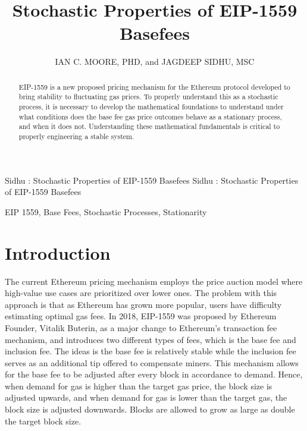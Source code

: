\documentclass[peerreview]{ieeesyscoin}
\begin{document}
\linenumbers
\history{}

\title{\centering Stochastic Properties of EIP-1559 Basefees}
\author{\centering  \uppercase{Ian C. Moore, PhD}, 
and \uppercase{Jagdeep Sidhu, MSc}}

\address[1]{\centering  (e-mail: ic3moore@gmail.com)}
\tfootnote{}
\address[2]{\centering Syscoin Core Developer, Blockchain Foundry Inc.(e-mail: jsidhu@blockchainfoundry.co)}


\markboth
{Sidhu \headeretal: Stochastic Properties of EIP-1559 Basefees}
{Sidhu \headeretal: Stochastic Properties of EIP-1559 Basefees}

\corresp{}

\begin{abstract}
EIP-1559 is a new proposed pricing mechanism for the Ethereum protocol developed to bring stability to fluctuating gas prices. To properly understand this as a stochastic process, it is necessary to develop the mathematical foundations to understand under what conditions does the base fee gas price outcomes behave as a stationary process, and when it does not. Understanding these mathematical fundamentals is critical to properly engineering a stable system.
\end{abstract}

\begin{keywords}
EIP 1559, Base Fees, Stochastic Processes, Stationarity
\end{keywords}

\titlepgskip=-15pt

\maketitle

\section{Introduction}
\label{sec:introduction}

The current Ethereum pricing mechanism employs the price auction model where high-value use cases are prioritized over lower ones. The problem with this approach is that as Ethereum has grown more popular, users have difficulty estimating optimal gas fees. In 2018, EIP-1559 was  proposed by Ethereum Founder, Vitalik Buterin, as a major change to Ethereum's transaction fee mechanism, and introduces two different types of fees, which is the base fee and inclusion fee. The ideas is the base fee is relatively stable while the inclusion fee serves as an additional tip offered to compensate miners. This mechanism allows for the base fee to be adjusted after every block in accordance to demand. Hence, when demand for gas is higher than the target gas price, the block size is adjusted upwards, and when demand for gas is lower than the target gas, the block size is adjusted downwards. Blocks are allowed to grow as large as double the target block size.
\end{document}
